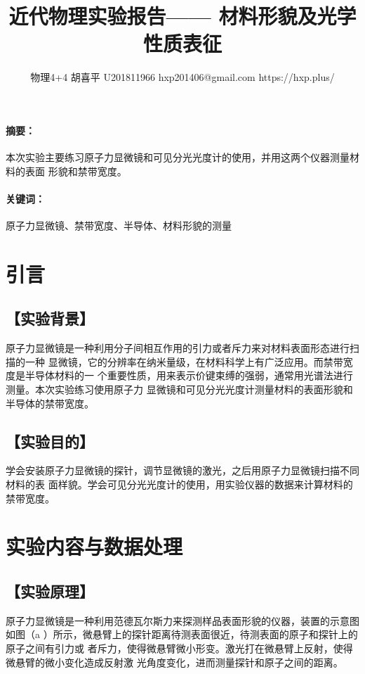 \documentclass{ctexart}
\date{}
\newcommand{\generatetitle}[6]{\title{\zihao{3}\heiti#1} \author{#2 \quad
    \quad #3 \quad\quad #4 \quad\quad #5 \quad\quad #6} \maketitle\thispagestyle{fancy}}
\let\oldsubsection\subsection
\renewcommand{\subsection}[1]{\oldsubsection{\!\!\!\!\!\!【#1】}}
\let\oldparagraph\paragraph
\renewcommand{\paragraph}[1]{\oldparagraph{#1：\!\!\!\!\!\!}}
\begin{document}
\generatetitle{近代物理实验报告——
  材料形貌及光学性质表征}{物理4+4}{胡喜平}{U201811966}{hxp201406@gmail.com}{https://hxp.plus/}

\paragraph{摘要}
本次实验主要练习原子力显微镜和可见分光光度计的使用，并用这两个仪器测量材料的表面
形貌和禁带宽度。

\paragraph{关键词}
原子力显微镜、禁带宽度、半导体、材料形貌的测量

\section{引言}
\subsection{实验背景}
原子力显微镜是一种利用分子间相互作用的引力或者斥力来对材料表面形态进行扫描的一种
显微镜，它的分辨率在纳米量级，在材料科学上有广泛应用。而禁带宽度是半导体材料的一
个重要性质，用来表示价键束缚的强弱，通常用光谱法进行测量。本次实验练习使用原子力
显微镜和可见分光光度计测量材料的表面形貌和半导体的禁带宽度。

\subsection{实验目的}
学会安装原子力显微镜的探针，调节显微镜的激光，之后用原子力显微镜扫描不同材料的表
面样貌。学会可见分光光度计的使用，用实验仪器的数据来计算材料的禁带宽度。

\section{实验内容与数据处理}
\subsection{实验原理}
原子力显微镜是一种利用范德瓦尔斯力来探测样品表面形貌的仪器，装置的示意图如图（a
）所示，微悬臂上的探针距离待测表面很近，待测表面的原子和探针上的原子之间有引力或
者斥力，使得微悬臂微小形变。激光打在微悬臂上反射，使得微悬臂的微小变化造成反射激
光角度变化，进而测量探针和原子之间的距离。
\end{document}
